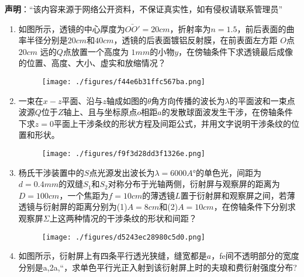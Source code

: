 

\textbf{声明}：“该内容来源于网络公开资料，不保证真实性，如有侵权请联系管理员”
\begin{enumerate}
\item 如图所示，透镜的中心厚度为$\bar{OO'}=20cm$，折射率为$n=1.5$，前后表面的曲率半径分别是$20cm$和$40cm$，透镜的后表面镀铝反射膜，在前表面左方距 $O$点 $20cm$ 远的$Q$点放置一个高度为 $1mm $的小物$y$，在傍轴条件下求透镜最后成像的位置、高度、大小、虚实和放缩情况？
\begin{figure}[ht]
\centering
\texttt{[image: ./figures/f44e6b31ffc567ba.png]}
\caption{} \label{fig_HGD04_2}
\end{figure}
\item 一束在$x-z$平面、沿与$z$轴成如图的$\theta$角方向传播的波长为$\lambda$的平面波和一束点波源$Q$位于$Z$轴上、且与坐标原点$o$相距$a$的发散球面波发生干涉，在傍轴条件下求$z=0$平面上干涉条纹的形状方程及间距公式，并用文字说明干涉条纹的位置和形状。
\begin{figure}[ht]
\centering
\texttt{[image: ./figures/f9f3d28dd3f1326e.png]}
\caption{} \label{fig_HGD04_1}
\end{figure}
\item 杨氏干涉装置中的$S$点光源发出波长为$\lambda=6000A$°的单色光，间距为$d=0.4mm$的双缝$S_1$和$S_2$对称分布于光轴两侧，衍射屏与观察屏的距离为$D=100cm$，一个焦距为$f=10cm$的薄透镜$L$置于衍射屏和观察屏之间，若薄透镜与衍射屏的距离分别为(1)$A=8cm$和(2)$A=10cm$，在傍轴条件下分别求观察屏$\Sigma$上这两种情况的干涉条纹的形状和间距？
\begin{figure}[ht]
\centering
\texttt{[image: ./figures/d5243ec28980c5d0.png]}
\caption{} \label{fig_HGD04_3}
\end{figure}
\item 如图所示，衍射屏上有四条平行透光狭缝，缝宽都是$a$，fe间不透明部分的宽度分别是a,2a,“，求单色平行光正入射到该衍射屏上时的夫琅和费衍射强度分布?
\end{enumerate}